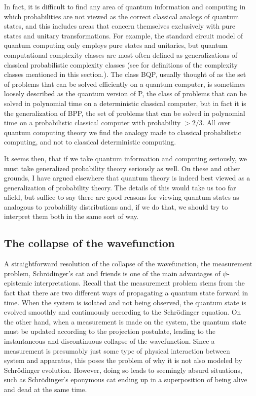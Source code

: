 \documentclass[DIV=calc,fontsize=12pt]{scrartcl} %
\theoremstyle{definition}
\theoremstyle{plain}
\begin{document}
In fact, it is difficult to find any area of quantum information and
computing in which probabilities are not viewed as the correct
classical analogs of quantum states, and this includes areas that
concern themselves exclusively with pure states and unitary
transformations.  For example, the standard circuit model of quantum
computing \cite{Nielsen2000} only employs pure states and unitaries,
but quantum computational complexity classes are most often defined as
generalizations of classical probabilistic complexity classes (see
\cite{Zoo} for definitions of the complexity classes mentioned in this
section.).  The class BQP, usually thought of as the set of problems
that can be solved efficiently on a quantum computer, is sometimes
loosely described as the quantum version of P, the class of problems
that can be solved in polynomial time on a deterministic classical
computer, but in fact it is the generalization of BPP, the set of
problems that can be solved in polynomial time on a probabilistic
classical computer with probability $> 2/3$.  All over quantum
computing theory we find the analogy made to classical probabilistic
computing, and not to classical deterministic computing.

It seems then, that if we take quantum information and computing
seriously, we must take generalized probability theory seriously as
well.  On these and other grounds, I have argued elsewhere
\cite{Leifer2013a, Leifer2013b} that quantum theory is indeed best
viewed as a generalization of probability theory.  The details of this
would take us too far afield, but suffice to say there are good
reasons for viewing quantum states as analogous to probability
distributions and, if we do that, we should try to interpret them both
in the same sort of way.

\subsection{The collapse of the wavefunction}

\label{Collapse}

A straightforward resolution of the collapse of the wavefunction, the
measurement problem, Schr{\"o}dinger's cat and friends is one of the
main advantages of $\psi$-epistemic interpretations.  Recall that the
measurement problem stems from the fact that there are two different
ways of propagating a quantum state forward in time.  When the system
is isolated and not being observed, the quantum state is evolved
smoothly and continuously according to the Schr{\"o}dinger equation.
On the other hand, when a measurement is made on the system, the
quantum state must be updated according to the projection postulate,
leading to the instantaneous and discontinuous collapse of the
wavefunction.  Since a measurement is presumably just some type of
physical interaction between system and apparatus, this poses the
problem of why it is not also modeled by Schr{\"o}dinger evolution.
However, doing so leads to seemingly absurd situations, such as
Schr{\"o}dinger's eponymous cat ending up in a superposition of being
alive and dead at the same time.
\end{document}
